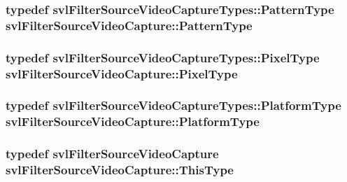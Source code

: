 \subsubsection[{Pattern\+Type}]{\setlength{\rightskip}{0pt plus 5cm}typedef {\bf svl\+Filter\+Source\+Video\+Capture\+Types\+::\+Pattern\+Type} {\bf svl\+Filter\+Source\+Video\+Capture\+::\+Pattern\+Type}}\label{classsvl_filter_source_video_capture_a374a69b1d506cf982ba5ce45d5f84776}
\hypertarget{classsvl_filter_source_video_capture_a0d92a26e94ffd48535df5ab2ff330c90}{}
\subsubsection[{Pixel\+Type}]{\setlength{\rightskip}{0pt plus 5cm}typedef {\bf svl\+Filter\+Source\+Video\+Capture\+Types\+::\+Pixel\+Type} {\bf svl\+Filter\+Source\+Video\+Capture\+::\+Pixel\+Type}}\label{classsvl_filter_source_video_capture_a0d92a26e94ffd48535df5ab2ff330c90}
\hypertarget{classsvl_filter_source_video_capture_a75f10dbd026c0ae70007a18758895ea0}{}
\subsubsection[{Platform\+Type}]{\setlength{\rightskip}{0pt plus 5cm}typedef {\bf svl\+Filter\+Source\+Video\+Capture\+Types\+::\+Platform\+Type} {\bf svl\+Filter\+Source\+Video\+Capture\+::\+Platform\+Type}}\label{classsvl_filter_source_video_capture_a75f10dbd026c0ae70007a18758895ea0}
\hypertarget{classsvl_filter_source_video_capture_ad91d138b62c181697b084d06a12fb55a}{}
\subsubsection[{This\+Type}]{\setlength{\rightskip}{0pt plus 5cm}typedef {\bf svl\+Filter\+Source\+Video\+Capture} {\bf svl\+Filter\+Source\+Video\+Capture\+::\+This\+Type}}\label{classsvl_filter_source_video_capture_ad91d138b62c181697b084d06a12fb55a}


